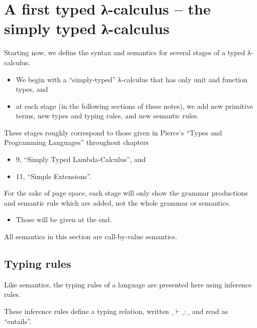 \documentclass[11pt]{article}
\theoremstyle{definition}
\begin{document}
\section{A first typed λ-calculus – the simply typed λ-calculus}
\label{sec:orgbf5c432}

Starting now, we define the syntax and semantics for several stages
of a typed λ-calculus.
\begin{itemize}
\item We begin with a “simply-typed” λ-calculus that has only
unit and function types, and
\item at each stage (in the following sections of these notes),
we add new primitive terms, new types
and typing rules, and new semantic rules.
\end{itemize}

These stages roughly correspond to those given in
Pierce's “Types and Programming Languages” throughout
chapters
\begin{itemize}
\item 9, “Simply Typed Lambda-Calculus”, and
\item 11, “Simple Extensions”.
\end{itemize}

For the sake of page space, each stage will only show
the grammar productions and semantic rule which are added,
not the whole grammar or semantics.
\begin{itemize}
\item Those will be given at the end.
\end{itemize}

All semantics in this section are call-by-value semantics.

\subsection{Typing rules}
\label{sec:org925dfa1}

Like semantics, the typing rules of a language
are presented here using inference rules.

These inference rules define a typing relation,
written \(\_⊢\_:\_\) and read as “entails”.
\end{document}
